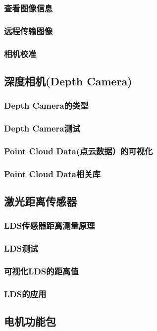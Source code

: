 \documentclass[geye,green,kindle,cn]{elegantnote}
\begin{document}
\subsubsection{查看图像信息}
\subsubsection{远程传输图像}
\subsubsection{相机校准}
\subsection{深度相机(Depth Camera)}
\subsubsection{Depth Camera的类型}
\subsubsection{Depth Camera测试}
\subsubsection{Point Cloud Data(点云数据）的可视化}
\subsubsection{Point Cloud Data相关库}
\subsection{激光距离传感器}
\subsubsection{LDS传感器距离测量原理}
\subsubsection{LDS测试}
\subsubsection{可视化LDS的距离值}
\subsubsection{LDS的应用}
\subsection{电机功能包}
\end{document}
